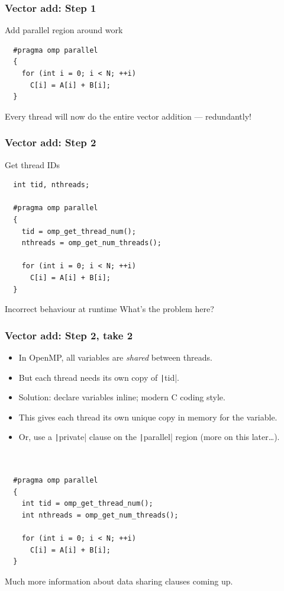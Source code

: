 \documentclass[aspectratio=169]{beamer}
\begin{document}
\begin{frame}[fragile]
\frametitle{Vector add: Step 1}
Add parallel region around work
\begin{verbatim}
  #pragma omp parallel
  {
    for (int i = 0; i < N; ++i)
      C[i] = A[i] + B[i];
  }
\end{verbatim}
Every thread will now do the entire vector addition --- redundantly!
\end{frame}

\begin{frame}[fragile]
\frametitle{Vector add: Step 2}
Get thread IDs
\begin{verbatim}
  int tid, nthreads;

  #pragma omp parallel
  {
    tid = omp_get_thread_num();
    nthreads = omp_get_num_threads();

    for (int i = 0; i < N; ++i)
      C[i] = A[i] + B[i];
  }
\end{verbatim}

\pause
\begin{alertblock}{Incorrect behaviour at runtime}
What's the problem here?
\end{alertblock}
\end{frame}

\begin{frame}[fragile]
\frametitle{Vector add: Step 2, take 2}

\begin{itemize}
  \item In OpenMP, all variables are \emph{shared} between threads.
  \item But each thread needs its own copy of \texttt|tid|.
  \item Solution: declare variables inline; modern C coding style.
  \item This gives each thread its own unique copy in memory for the variable.
  \item Or, use a \texttt|private| clause on the \texttt|parallel| region (more on this later\dots).
\end{itemize}

\begin{verbatim}


  #pragma omp parallel
  {
    int tid = omp_get_thread_num();
    int nthreads = omp_get_num_threads();

    for (int i = 0; i < N; ++i)
      C[i] = A[i] + B[i];
  }
\end{verbatim}
Much more information about data sharing clauses coming up.
\end{frame}
\end{document}
